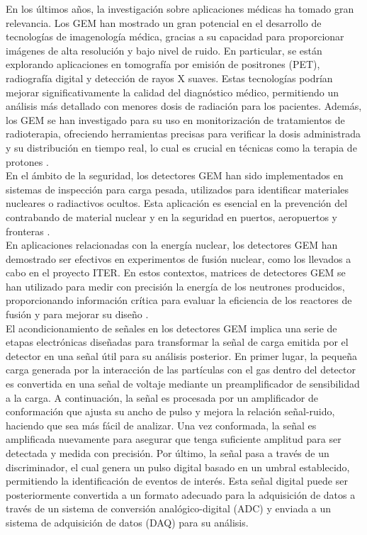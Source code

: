 \documentclass{article}
\begin{document}
\noindent En los últimos años, la investigación sobre aplicaciones médicas ha tomado gran relevancia. Los GEM han mostrado un gran potencial en el desarrollo de tecnologías de imagenología médica, gracias a su capacidad para proporcionar imágenes de alta resolución y bajo nivel de ruido. En particular, se están explorando aplicaciones en tomografía por emisión de positrones (PET), radiografía digital y detección de rayos X suaves. Estas tecnologías podrían mejorar significativamente la calidad del diagnóstico médico, permitiendo un análisis más detallado con menores dosis de radiación para los pacientes. Además, los GEM se han investigado para su uso en monitorización de tratamientos de radioterapia, ofreciendo herramientas precisas para verificar la dosis administrada y su distribución en tiempo real, lo cual es crucial en técnicas como la terapia de protones \cite{tsyganov2008gas} \cite{murtas2014applications}.\\

\noindent En el ámbito de la seguridad, los detectores GEM han sido implementados en sistemas de inspección para carga pesada, utilizados para identificar materiales nucleares o radiactivos ocultos. Esta aplicación es esencial en la prevención del contrabando de material nuclear y en la seguridad en puertos, aeropuertos y fronteras \cite{saenboonruang2015recent}.\\

\noindent En aplicaciones relacionadas con la energía nuclear, los detectores GEM han demostrado ser efectivos en experimentos de fusión nuclear, como los llevados a cabo en el proyecto ITER. En estos contextos, matrices de detectores GEM se han utilizado para medir con precisión la energía de los neutrones producidos, proporcionando información crítica para evaluar la eficiencia de los reactores de fusión y para mejorar su diseño \cite{croci2015gem} \cite{chernyshovaapplication}.\\

\noindent El acondicionamiento de señales en los detectores GEM implica una serie de etapas electrónicas diseñadas para transformar la señal de carga emitida por el detector en una señal útil para su análisis posterior. En primer lugar, la pequeña carga generada por la interacción de las partículas con el gas dentro del detector es convertida en una señal de voltaje mediante un preamplificador de sensibilidad a la carga. A continuación, la señal es procesada por un amplificador de conformación que ajusta su ancho de pulso y mejora la relación señal-ruido, haciendo que sea más fácil de analizar. Una vez conformada, la señal es amplificada nuevamente para asegurar que tenga suficiente amplitud para ser detectada y medida con precisión. Por último, la señal pasa a través de un discriminador, el cual genera un pulso digital basado en un umbral establecido, permitiendo la identificación de eventos de interés. Esta señal digital puede ser posteriormente convertida a un formato adecuado para la adquisición de datos a través de un sistema de conversión analógico-digital (ADC) y enviada a un sistema de adquisición de datos (DAQ) para su análisis.
\newpage
\end{document}
